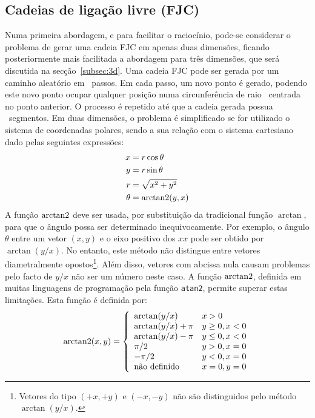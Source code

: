 \subsection{Cadeias de ligação livre (FJC)}
\label{subsec:fjc}
Numa primeira abordagem, e para facilitar o raciocínio, pode-se considerar o problema de gerar uma cadeia FJC em apenas duas dimensões, ficando posteriormente mais facilitada a abordagem para três dimensões, que será discutida na secção~\ref{subsec:3d}. Uma cadeia FJC pode ser gerada por um caminho aleatório em \numsegmento\ passos. Em cada passo, um novo ponto é gerado, podendo este novo ponto ocupar qualquer posição numa circunferência de raio \comsegmento\ centrada no ponto anterior. O processo é repetido até que a cadeia gerada possua \numsegmento\ segmentos. Em duas dimensões, o problema é simplificado se for utilizado o sistema de coordenadas polares, sendo a sua relação com o sistema cartesiano dado pelas seguintes expressões:
\begin{equation}
\label{eq:polar}
\begin{split}
       x & = r\cos\theta       \\
       y & = r\sin\theta       \\
	     r & = \sqrt{x^2+y^2}    \\
  \theta & = \mathrm{arctan2}(y,x)
\end{split}
\end{equation}
A função $\mathrm{arctan2}$ deve ser usada, por substituição da tradicional função $\arctan$, para que o ângulo possa ser determinado inequivocamente. 
%
Por exemplo, o ângulo $\theta$ entre um vetor $(x,y)$ e o eixo positivo dos $xx$ pode ser obtido por $\arctan(y/x)$. 
No entanto, este método não distingue entre vetores diametralmente opostos\footnote{Vetores do tipo $(+x,+y)$ e $(-x,-y)$ não são distinguidos pelo método $\arctan(y/x)$.}. Além disso, vetores com abcissa nula causam problemas pelo facto de $y/x$ não ser um número neste caso. A função $\mathrm{arctan2}$, definida em muitas linguagens de programação pela função \texttt{atan2}, permite superar estas limitações. Esta função é definida por:
\begin{equation}
\mr{arctan2}(x,y)=\left\{ \begin{array}{ll}%
				\arctan(y/x) 		& \mbox{$x>0$}		\\
				\arctan(y/x)+\pi 	& \mbox{$y\geq0, x<0$}	\\
				\arctan(y/x)-\pi 	& \mbox{$y\leq0, x<0$}	\\
				\pi/2			& \mbox{$y>0, x=0$}	\\
				-\pi/2			& \mbox{$y<0, x=0$}	\\
				\text{não definido}	& \mbox{$x=0, y=0$}	
			         \end{array}    	
			\right.
\end{equation}
